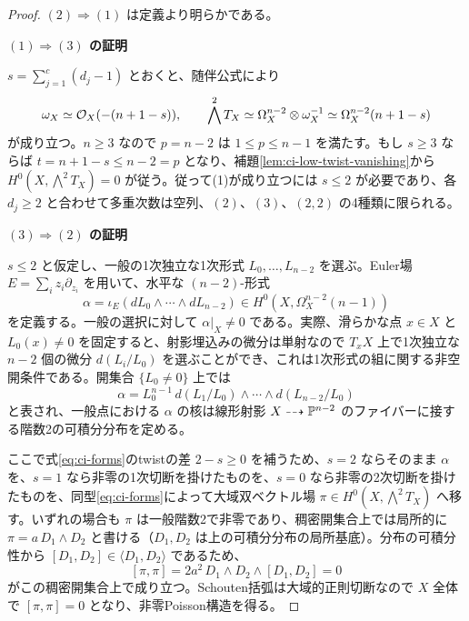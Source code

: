 \begin{proof}
$(2)\Rightarrow(1)$ は定義より明らかである。

\par\medskip\noindent\textbf{$(1)\Rightarrow(3)$ の証明}\par\nobreak\smallskip
$s=\sum_{j=1}^c(d_j-1)$ とおくと、随伴公式により
\begin{equation}
\omega_X\simeq\mathcal O_X(-(n+1-s)),\qquad
\bigwedge^2T_X\simeq\Omega_X^{n-2}\otimes\omega_X^{-1}\simeq\Omega_X^{n-2}(n+1-s)
\label{eq:ci-forms}
\end{equation}
が成り立つ。$n\ge3$ なので $p=n-2$ は $1\le p\le n-1$ を満たす。もし $s\ge3$ ならば $t=n+1-s\le n-2=p$ となり、補題\ref{lem:ci-low-twist-vanishing}から $H^0(X,\bigwedge^2T_X)=0$ が従う。従って(1)が成り立つには $s\le2$ が必要であり、各 $d_j\ge2$ と合わせて多重次数は空列、$(2)$、$(3)$、$(2,2)$ の4種類に限られる。

\par\medskip\noindent\textbf{$(3)\Rightarrow(2)$ の証明}\par\nobreak\smallskip
$s\le2$ と仮定し、一般の1次独立な1次形式 $L_0,\ldots,L_{n-2}$ を選ぶ。Euler場 $E=\sum_i z_i\partial_{z_i}$ を用いて、水平な $(n-2)$-形式
\begin{equation}
\alpha=\iota_E(dL_0\wedge\cdots\wedge dL_{n-2})
  \in H^0(X,\Omega_X^{n-2}(n-1))
\label{eq:ci-projective-form}
\end{equation}
を定義する。一般の選択に対して $\alpha|_X\ne0$ である。実際、滑らかな点 $x\in X$ と $L_0(x)\ne0$ を固定すると、射影埋込みの微分は単射なので $T_xX$ 上で1次独立な $n-2$ 個の微分 $d(L_i/L_0)$ を選ぶことができ、これは1次形式の組に関する非空開条件である。開集合 $\{L_0\ne0\}$ 上では
\begin{equation}
\alpha=L_0^{n-1}\,
d(L_1/L_0)\wedge\cdots\wedge d(L_{n-2}/L_0)
\label{eq:ci-local-form}
\end{equation}
と表され、一般点における $\alpha$ の核は線形射影 $X\dashrightarrow\mathbb P^{n-2}$ のファイバーに接する階数2の可積分分布を定める。

ここで式\eqref{eq:ci-forms}のtwistの差 $2-s\ge0$ を補うため、$s=2$ ならそのまま $\alpha$ を、$s=1$ なら非零の1次切断を掛けたものを、$s=0$ なら非零の2次切断を掛けたものを、同型\eqref{eq:ci-forms}によって大域双ベクトル場 $\pi\in H^0(X,\bigwedge^2T_X)$ へ移す。いずれの場合も $\pi$ は一般階数2で非零であり、稠密開集合上では局所的に $\pi=a\,D_1\wedge D_2$ と書ける（$D_1,D_2$ は上の可積分分布の局所基底）。分布の可積分性から $[D_1,D_2]\in\langle D_1,D_2\rangle$ であるため、
\[
  [\pi,\pi]=2a^2\,D_1\wedge D_2\wedge[D_1,D_2]=0
\]
がこの稠密開集合上で成り立つ。Schouten括弧は大域的正則切断なので $X$ 全体で $[\pi,\pi]=0$ となり、非零Poisson構造を得る。
\end{proof}

